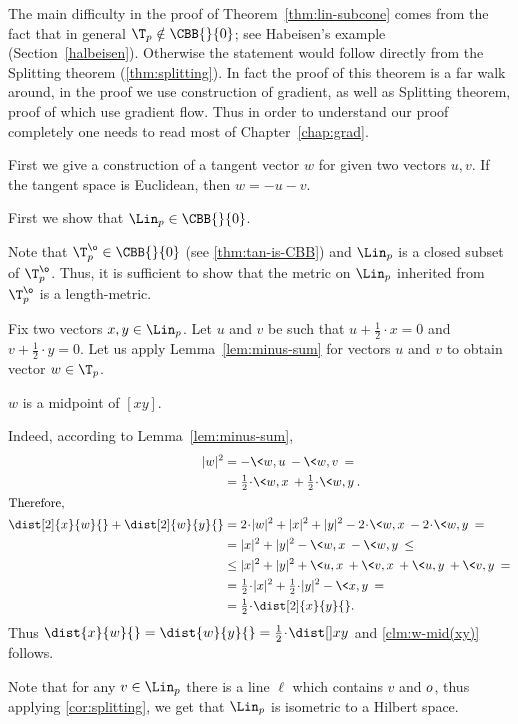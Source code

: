 The main difficulty in the proof of Theorem~\ref{thm:lin-subcone} comes from the fact that in general $\T_p\notin\CBB{}{0}$;
see Habeisen's example (Section~\ref{halbeisen}).
Otherwise the statement would follow directly from the Splitting theorem (\ref{thm:splitting}).
In fact the proof of this theorem is a far walk around, in the proof we use construction of gradient, as well as Splitting theorem, proof of which use gradient flow.
Thus in order to understand our proof completely one needs to read most of Chapter~\ref{chap:grad}.

First we give a construction of a tangent vector $w$ for given two vectors $u,v$.
If the tangent space is Euclidean, then  $w=-u-v$.




First we show that $\Lin_p\in \CBB{}{0}$.

Note that $\T^\o_p\in \CBB{}{0}$ (see \ref{thm:tan-is-CBB}) and $\Lin_p$ is a closed subset of $\T^\o_p$.
Thus, it is sufficient to show that the metric on $\Lin_p$ inherited from $\T^\o_p$ is a length-metric.

Fix two vectors $x,y\in\Lin_p$.
Let $u$ and $v$ be such that $u+\tfrac{1}{2}\cdot x=0$ 
and $v+\tfrac{1}{2}\cdot y=0$.
Let us apply Lemma~\ref{lem:minus-sum} 
for vectors $u$ and $v$ to obtain vector $w\in \T_p$.
\begin{clm}{}\label{clm:w-mid(xy)}
$w$ is a midpoint of $[x y]$.
\end{clm}

Indeed, according to Lemma~\ref{lem:minus-sum}, 
\begin{align*}
|w|^2
&=
-\<w,u\>-\<w,v\>
=
\\
&=
\tfrac{1}{2}\cdot\<w,x\>+\tfrac{1}{2}\cdot\<w,y\>.
\\
\intertext{Therefore,}
\dist[2]{x}{w}{}+\dist[2]{w}{y}{}
&=2\cdot|w|^2+|x|^2+|y|^2-2\cdot\<w,x\>-2\cdot\<w,y\>=\\
&=|x|^2+|y|^2-\<w,x\>-\<w,y\>\le\\
&\le |x|^2+|y|^2+\<u,x\>+\<v,x\>+\<u,y\>+\<v,y\>=\\
&=\tfrac{1}{2}\cdot|x|^2+\tfrac{1}{2}\cdot|y|^2-\<x,y\>=\\
&=\tfrac{1}{2}\cdot\dist[2]{x}{y}{}.
\end{align*}
Thus $\dist{x}{w}{}=\dist{w}{y}{}=\tfrac{1}{2}\cdot\dist[{{}}]{x}{y}{}$ and \ref{clm:w-mid(xy)} follows.
\claimqeds

Note that for any $v\in\Lin_p$ there is a line $\ell$ which contains $v$ and $o$, thus applying \ref{cor:splitting}, we get that $\Lin_p$ is isometric to a Hilbert space.
\qeds

